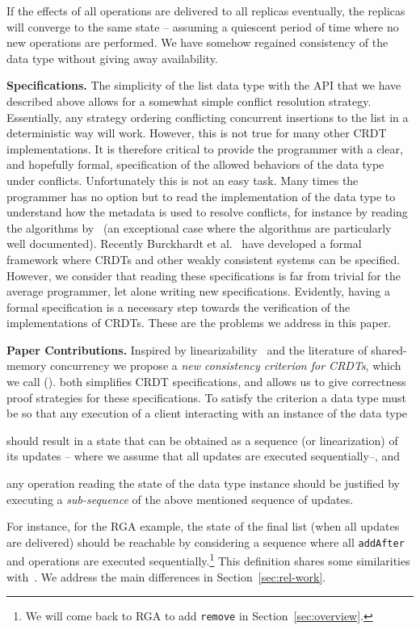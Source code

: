 If the effects of all operations are
delivered to all replicas eventually, the replicas will converge to
the same state -- assuming a quiescent period of time where no new
operations are performed.
%
We have somehow regained consistency of the data type without
giving away availability.

\smallskip
\noindent
{\bf Specifications.}
The simplicity of the list data type with the API that we have
described above allows for a somewhat simple conflict resolution
strategy.
%
Essentially, any strategy ordering conflicting concurrent insertions
to the list in a deterministic way will work.
%
However, this is not true for many other CRDT implementations.
%
It is therefore critical to provide the programmer with a clear, and
hopefully formal, specification of the allowed behaviors of the data
type under conflicts.
%
Unfortunately this is not an easy task.
%
Many times the programmer has no option but to read the implementation
of the data type to understand how the metadata is used to 
resolve conflicts, for instance by reading the algorithms
by~\citet{ShapiroPBZ11} (an exceptional case where the algorithms are
particularly well documented).
%
Recently Burckhardt et al.~\cite{BurckhardtGYZ14, Burckhardt14} have
developed a formal framework where CRDTs and other weakly
consistent systems can be specified.
%
However, we consider that reading these specifications is far from
trivial for the average programmer, let alone writing new
specifications.
%
Evidently, having a formal specification is a necessary step towards
the verification of the implementations of CRDTs.
%
These are the problems we address in this paper.

\smallskip
\noindent
{\bf Paper Contributions.}
Inspired by linearizability~\cite{HerlihyW90} and the literature of
shared-memory concurrency we propose a \emph{new consistency criterion
  for CRDTs}, which we call \emph{\CRDTLin{}} (\CRDTLinshort{}).
%
\CRDTLinshort{} both simplifies CRDT specifications, and allows us to
give correctness proof strategies for these specifications.
%
To satisfy the \CRDTLinshort{} criterion a data type must be so that
any execution of a client interacting with an instance of the data
type
\begin{inparaenum}
\item should result in a state that can be obtained as a sequence (or
  linearization) of its updates -- where we assume that all updates
  are executed sequentially--, and
\item any operation reading the state of the data type instance should
  be justified by executing a \emph{sub-sequence} of the above
  mentioned sequence of updates.
\end{inparaenum}
For instance, for the RGA example, the state of the final
list (when all updates are delivered) should be reachable by considering a sequence where all
\lstinline|addAfter| and  operations are executed sequentially.\footnote{We
  will come back to RGA to add \lstinline|remove|
  in Section~\ref{sec:overview}.}
%
This definition shares some similarities with~\citet{PerrinMJ14}. 
%
We address the main differences in Section~\ref{sec:rel-work}.

